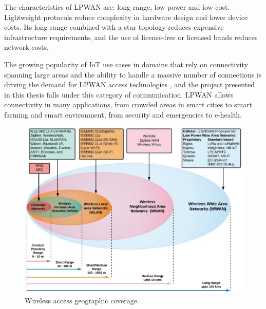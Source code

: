 		The characteristics of LPWAN are: long range, low power and low cost.
		Lightweight protocols reduce complexity in hardware design and lower device costs. Its long range combined with a star topology reduces expensive infrastructure requirements, and the use of license-free or licensed bands reduces network costs.
	
		The growing popularity of IoT use cases in domains that rely on connectivity spanning large areas and the ability to handle a massive number of connections is driving the demand for LPWAN access technologies \cite{fi12030046}, and the project presented in this thesis falls under this category of communication.
		LPWAN allows connectivity in many applications, from crowded areas in smart cities to smart farming and smart environment, from security and emergencies to e-health.
		
		\begin{figure}
			\centering
			\includegraphics[width=\textheight,height=\textwidth,keepaspectratio,angle=90]{resources/img/chap3/iot_range}
			\caption[Wireless access geographic coverage.]{Wireless access geographic coverage. \cite{fi12030046}}
			\label{img:wireless_coverage}
		\end{figure}
		
